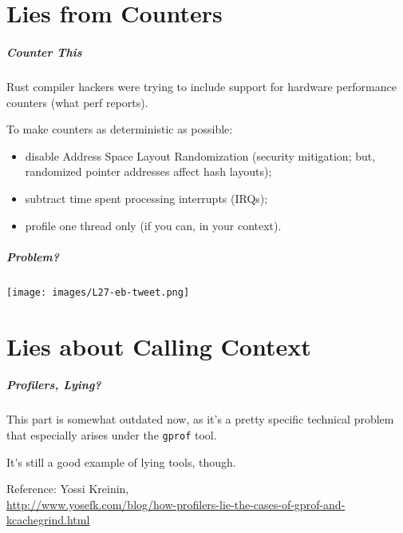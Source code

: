 \part{Lies from Counters}

\begin{frame}
\partpage
\end{frame}


\begin{frame}
\frametitle{Counter This}

Rust compiler hackers were trying to include
support for hardware performance counters (what perf reports).

To make counters as deterministic as possible:
\begin{itemize}
\item disable Address Space Layout Randomization (security mitigation; but, randomized pointer addresses affect hash layouts);
\item subtract time spent processing interrupts (IRQs);
\item profile one thread only (if you can, in your context).
\end{itemize}


\end{frame}


\begin{frame}
\frametitle{Problem?}

\begin{center}
\texttt{[image: images/L27-eb-tweet.png]}
\end{center}


\end{frame}



\part{Lies about Calling Context}

\begin{frame}
  \partpage
\end{frame}


\begin{frame}
\frametitle{Profilers, Lying?}

This part is somewhat outdated now, as it's a pretty specific technical problem that especially arises under the {\tt gprof} tool. 

It's still a good example of lying tools, though.

  \begin{center}
    Reference: Yossi Kreinin,\\
  \scriptsize
  \url{http://www.yosefk.com/blog/how-profilers-lie-the-cases-of-gprof-and-kcachegrind.html}
  \end{center}

\end{frame}

